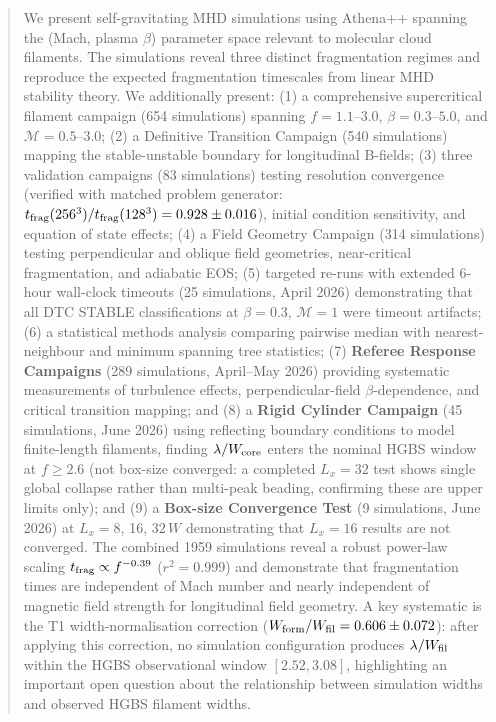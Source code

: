 \documentclass[twoside,twocolumn]{mnras}
\begin{document}
\begin{abstract}
We present self-gravitating MHD simulations using Athena++ spanning the (Mach, plasma $\beta$) parameter space relevant to molecular cloud filaments. The simulations reveal three distinct fragmentation regimes and reproduce the expected fragmentation timescales from linear MHD stability theory. We additionally present: (1) a comprehensive supercritical filament campaign (654 simulations) spanning $f = 1.1$--$3.0$, $\beta = 0.3$--$5.0$, and $\mathcal{M} = 0.5$--$3.0$; (2) a Definitive Transition Campaign (540 simulations) mapping the stable-unstable boundary for longitudinal B-fields; (3) three validation campaigns (83 simulations) testing resolution convergence (verified with matched problem generator: $t_{\rm frag}(256^3)/t_{\rm frag}(128^3) = 0.928 \pm 0.016$), initial condition sensitivity, and equation of state effects; (4) a Field Geometry Campaign (314 simulations) testing perpendicular and oblique field geometries, near-critical fragmentation, and adiabatic EOS; (5) targeted re-runs with extended 6-hour wall-clock timeouts (25 simulations, April 2026) demonstrating that all DTC STABLE classifications at $\beta = 0.3$, $\mathcal{M} = 1$ were timeout artifacts; (6) a statistical methods analysis comparing pairwise median with nearest-neighbour and minimum spanning tree statistics; (7) \textbf{Referee Response Campaigns} (289 simulations, April--May 2026) providing systematic measurements of turbulence effects, perpendicular-field $\beta$-dependence, and critical transition mapping; and (8) a \textbf{Rigid Cylinder Campaign} (45 simulations, June 2026) using reflecting boundary conditions to model finite-length filaments, finding $\lambda/W_{\rm core}$ enters the nominal HGBS window at $f \geq 2.6$ (not box-size converged: a completed $L_x = 32$ test shows single global collapse rather than multi-peak beading, confirming these are upper limits only); and (9) a \textbf{Box-size Convergence Test} (9 simulations, June 2026) at $L_x = 8$, 16, $32\,W$ demonstrating that $L_x = 16$ results are not converged. The combined 1959 simulations reveal a robust power-law scaling $t_{\rm frag} \propto f^{-0.39}$ ($r^2 = 0.999$) and demonstrate that fragmentation times are independent of Mach number and nearly independent of magnetic field strength for longitudinal field geometry. A key systematic is the T1 width-normalisation correction ($W_{\rm form}/W_{\rm fil} = 0.606 \pm 0.072$): after applying this correction, no simulation configuration produces $\lambda/W_{\rm fil}$ within the HGBS observational window $[2.52, 3.08]$, highlighting an important open question about the relationship between simulation widths and observed HGBS filament widths.
\end{abstract}
\end{document}
